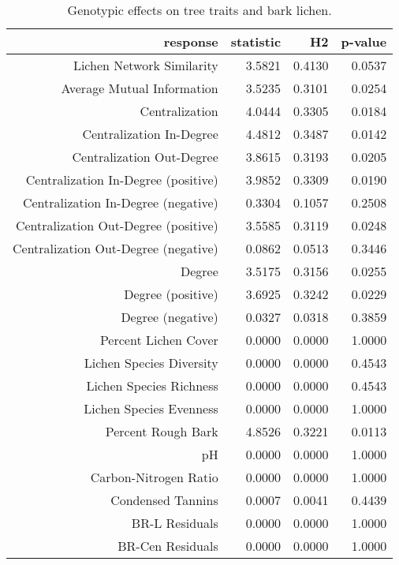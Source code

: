 \begin{table}[ht]
\centering
\begin{tabular}{rrrr}
  \hline
response & statistic & H2 & p-value \\ 
  \hline
Lichen Network Similarity & 3.5821 & 0.4130 & 0.0537 \\ 
  Average Mutual Information & 3.5235 & 0.3101 & 0.0254 \\ 
  Centralization & 4.0444 & 0.3305 & 0.0184 \\ 
  Centralization In-Degree & 4.4812 & 0.3487 & 0.0142 \\ 
  Centralization Out-Degree & 3.8615 & 0.3193 & 0.0205 \\ 
  Centralization In-Degree (positive) & 3.9852 & 0.3309 & 0.0190 \\ 
  Centralization In-Degree (negative) & 0.3304 & 0.1057 & 0.2508 \\ 
  Centralization Out-Degree (positive) & 3.5585 & 0.3119 & 0.0248 \\ 
  Centralization Out-Degree (negative) & 0.0862 & 0.0513 & 0.3446 \\ 
  Degree & 3.5175 & 0.3156 & 0.0255 \\ 
  Degree (positive) & 3.6925 & 0.3242 & 0.0229 \\ 
  Degree (negative) & 0.0327 & 0.0318 & 0.3859 \\ 
  Percent Lichen Cover & 0.0000 & 0.0000 & 1.0000 \\ 
  Lichen Species Diversity & 0.0000 & 0.0000 & 0.4543 \\ 
  Lichen Species Richness & 0.0000 & 0.0000 & 0.4543 \\ 
  Lichen Species Evenness & 0.0000 & 0.0000 & 1.0000 \\ 
  Percent Rough Bark & 4.8526 & 0.3221 & 0.0113 \\ 
  pH & 0.0000 & 0.0000 & 1.0000 \\ 
  Carbon-Nitrogen Ratio & 0.0000 & 0.0000 & 1.0000 \\ 
  Condensed Tannins & 0.0007 & 0.0041 & 0.4439 \\ 
  BR-L Residuals & 0.0000 & 0.0000 & 1.0000 \\ 
  BR-Cen Residuals & 0.0000 & 0.0000 & 1.0000 \\ 
   \hline
\end{tabular}
\caption{Genotypic effects on tree traits and bark lichen.} 
\label{tab:h2_table}
\end{table}

